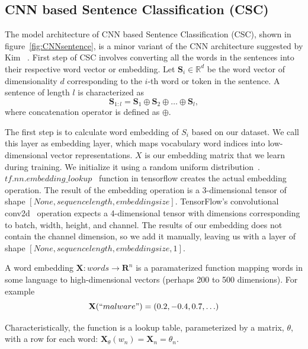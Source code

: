 \subsection{CNN based Sentence Classification (CSC)}




The model architecture of CNN based Sentence Classification (CSC), shown in figure~\ref{fig:CNNsentence}, is a minor variant of the CNN architecture suggested by Kim ~\cite{kim}. First step of CSC involves converting all the words in the sentences into their respective word vector or embedding.
Let $\mathbf{S}_i \in \mathbb{R}^{d}$ be the  word vector of dimensionality $d$ corresponding to the $i$-th word or token in the sentence. A sentence of length $l$ is characterized as
\begin{equation}
\mathbf{S}_{1:l} = \mathbf{S}_1 \oplus \mathbf{S}_2 \oplus \ldots \oplus \mathbf{S}_l,
\end{equation}
where concatenation operator is defined as $\oplus$. 




The first step is to calculate word embedding of $S_i$ based on our dataset. We call this layer as embedding layer, which maps vocabulary word indices into low-dimensional vector representations. $X$ is our embedding matrix that we learn during training. We initialize it using a random uniform distribution~\cite{claessen}. $tf.nn.embedding\_lookup$~\cite{tensorflowapi} function in tensorflow creates the actual embedding operation. The result of the embedding operation is a 3-dimensional tensor of shape $[None, sequencelength, embeddingsize]$.
TensorFlow's convolutional conv2d~\cite{tensorflowapi} operation expects a 4-dimensional tensor with dimensions corresponding to batch, width, height, and channel. The results of our embedding does not contain the channel dimension, so we add it manually, leaving us with a layer of shape $[None, sequencelength, embeddingsize, 1]$.

A word embedding $\mathbf{X} \colon words \rightarrow \mathbf{R}^n$  is a paramaterized function mapping words in some language to high-dimensional vectors (perhaps 200 to 500 dimensions). For example 
\begin{equation}
\mathbf{X}(``malware") = (0.2,-0.4,0.7,\ldots)
\end{equation}

Characteristically, the function is a lookup table, parameterized by a matrix, $\theta$, with a row for each word: $\mathbf{X}_\theta(w_n)= \mathbf{X}_n = \theta_n$.

